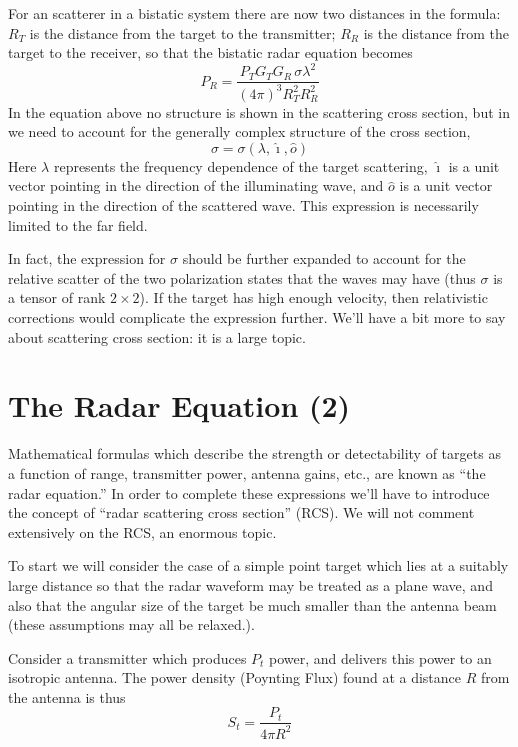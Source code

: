 For an scatterer in a bistatic system there are now two distances in
the formula: $R_T$ is the distance from the target to the transmitter;
$R_R$ is the distance from the target to the receiver, so that the
bistatic radar equation becomes
\begin{equation}
P_R = \frac{P_T G_T G_R \, \sigma \lambda^2}{(4\pi)^3 R_T^2 R_R^2}
\end{equation}
In the equation above no structure is shown in the scattering cross
section, but in we need to account for the generally complex structure
of the cross section,
\begin{equation}
\sigma = \sigma(\lambda, \hat{\imath}, \hat{o})
\end{equation}
Here $\lambda$ represents the frequency dependence of the target
scattering, $\hat{\imath}$ is a unit vector pointing in the direction
of the illuminating wave, and $\hat{o}$ is a unit vector pointing in
the direction of the scattered wave.  This expression is necessarily
limited to the far field.

In fact, the expression for $\sigma$ should be further expanded to
account for the relative scatter of the two polarization states that
the waves may have (thus $\sigma$ is a tensor of rank $2\times 2$).
If the target has high enough velocity, then relativistic corrections
would complicate the expression further.  We'll have a bit more to say
about scattering cross section: it is a large topic.


\section{The Radar Equation (2)}

Mathematical formulas which describe the strength or detectability of
targets as a function of range, transmitter power, antenna gains,
etc., are known as ``the radar equation.''  In order to complete these
expressions we'll have to introduce the concept of ``radar scattering
cross section'' (RCS).  We will not comment extensively on the RCS, an
enormous topic.

To start we will consider the case of a simple point target which lies
at a suitably large distance so that the radar waveform may be treated
as a plane wave, and also that the angular size of the target be much
smaller than the antenna beam (these assumptions may all be relaxed.).

Consider a transmitter which produces $P_t$ power, and delivers this
power to an isotropic antenna.  The power density (Poynting Flux)
found at a distance $R$ from the antenna is thus
\begin{displaymath}
S_t = \frac{P_t}{4\pi R^2}
\end{displaymath}

